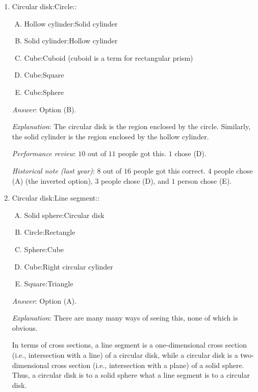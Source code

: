 \documentclass[10pt]{amsart}
\begin{document}
\begin{enumerate}
  {\em Performance review}: $5$ out of $11$ got this. $4$ chose (A),
  $1$ chose (E), $1$ left the question blank.

  {\em Historical note (last year)}: $13$ out of $16$ people got this
  correct. $2$ people chose (A) and $1$ person chose (E).
\item Circular disk:Circle::

  \begin{enumerate}[(A)]
  \item Hollow cylinder:Solid cylinder
  \item Solid cylinder:Hollow cylinder
  \item Cube:Cuboid (cuboid is a term for rectangular prism)
  \item Cube:Square
  \item Cube:Sphere
  \end{enumerate}
  
  {\em Answer}: Option (B).
  
  {\em Explanation}: The circular disk is the region enclosed by the
  circle. Similarly, the solid cylinder is the region enclosed by the
  hollow cylinder.

  {\em Performance review}: $10$ out of $11$ people got this. $1$
  chose (D).

  {\em Historical note (last year)}: $8$ out of $16$ people
  got this correct. $4$ people chose (A) (the inverted option), $3$
  people chose (D), and $1$ person chose (E).

\item Circular disk:Line segment::

  \begin{enumerate}[(A)]
  \item Solid sphere:Circular disk
  \item Circle:Rectangle
  \item Sphere:Cube
  \item Cube:Right circular cylinder
  \item Square:Triangle
  \end{enumerate}

  {\em Answer}: Option (A).

  {\em Explanation}: There are many many ways of seeing this, none of
  which is obvious.

  In terms of cross sections, a line segment is a one-dimensional
  cross section (i.e., intersection with a line) of a circular disk,
  while a circular disk is a two-dimensional cross section (i.e.,
  intersection with a plane) of a solid sphere. Thus, a circular disk
  is to a solid sphere what a line segment is to a circular disk.


\end{enumerate}
\end{document}

